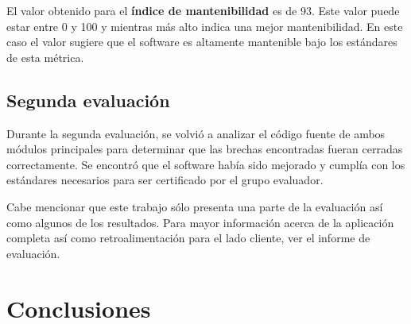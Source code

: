 \documentclass[letterpaper]{article}
\begin{document}
El valor obtenido para el \textbf{índice de mantenibilidad} es de 93. Este 
valor puede estar entre 0 y 100 y mientras más alto indica una mejor 
mantenibilidad. En este caso el valor sugiere que el software es altamente 
mantenible bajo los estándares de esta métrica.

\subsection{Segunda evaluación}
Durante la segunda evaluación, se volvió a analizar el código fuente de ambos
módulos principales para determinar que las brechas encontradas fueran cerradas
correctamente. Se encontró que el software había sido mejorado y cumplía con
los estándares necesarios para ser certificado por el grupo evaluador.

Cabe mencionar que este trabajo sólo presenta una parte de la evaluación así
como algunos de los resultados. Para mayor información acerca de la aplicación completa
así como retroalimentación para el lado cliente, ver el informe de evaluación.

\section{Conclusiones}






\footnotesize


\end{document}

